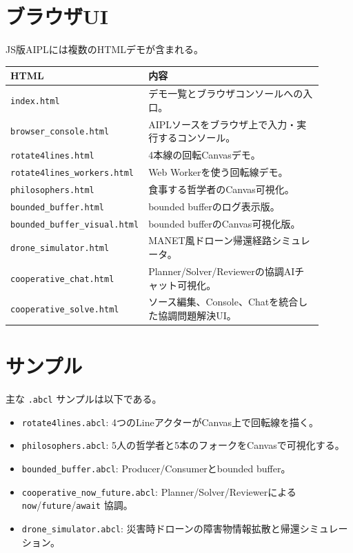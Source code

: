 \documentclass[11pt,a4paper,uplatex,dvipdfmx]{jsarticle}
\begin{document}
\section{ブラウザUI}

JS版AIPLには複数のHTMLデモが含まれる。

\begin{longtable}{p{0.34\linewidth}p{0.56\linewidth}}
\toprule
HTML & 内容 \\
\midrule
\texttt{index.html} & デモ一覧とブラウザコンソールへの入口。 \\
\texttt{browser\_console.html} & AIPLソースをブラウザ上で入力・実行するコンソール。 \\
\texttt{rotate4lines.html} & 4本線の回転Canvasデモ。 \\
\texttt{rotate4lines\_workers.html} & Web Workerを使う回転線デモ。 \\
\texttt{philosophers.html} & 食事する哲学者のCanvas可視化。 \\
\texttt{bounded\_buffer.html} & bounded bufferのログ表示版。 \\
\texttt{bounded\_buffer\_visual.html} & bounded bufferのCanvas可視化版。 \\
\texttt{drone\_simulator.html} & MANET風ドローン帰還経路シミュレータ。 \\
\texttt{cooperative\_chat.html} & Planner/Solver/Reviewerの協調AIチャット可視化。 \\
\texttt{cooperative\_solve.html} & ソース編集、Console、Chatを統合した協調問題解決UI。 \\
\bottomrule
\end{longtable}

\section{サンプル}

主な \texttt{.abcl} サンプルは以下である。

\begin{itemize}
  \item \texttt{rotate4lines.abcl}: 4つのLineアクターがCanvas上で回転線を描く。
  \item \texttt{philosophers.abcl}: 5人の哲学者と5本のフォークをCanvasで可視化する。
  \item \texttt{bounded\_buffer.abcl}: Producer/Consumerとbounded buffer。
  \item \texttt{cooperative\_now\_future.abcl}: Planner/Solver/Reviewerによる \texttt{now}/\texttt{future}/\texttt{await} 協調。
  \item \texttt{drone\_simulator.abcl}: 災害時ドローンの障害物情報拡散と帰還シミュレーション。
\end{itemize}
\end{document}
